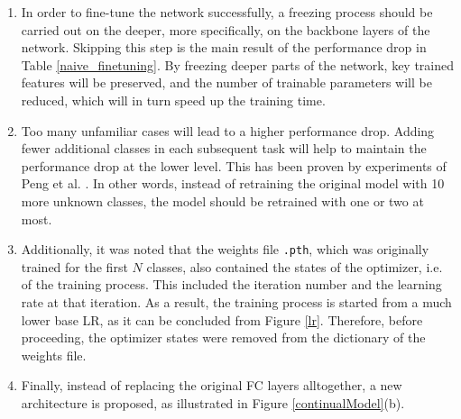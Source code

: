 \documentclass[english, 12pt, a4paper, elec, utf8, a-1b, online]{aaltothesis}
\begin{document}
\begin{enumerate}
\item In order to fine-tune the network successfully, a freezing process should be carried out on the deeper, more specifically, on the backbone layers of the network. Skipping this step is the main result of the performance drop in Table \ref{naive_finetuning}. By freezing deeper parts of the network, key trained features will be preserved, and the number of trainable parameters will be reduced, which will in turn speed up the training time. 
\item Too many unfamiliar cases will lead to a higher performance drop. Adding fewer additional classes in each subsequent task will help to maintain the performance drop at the lower level. This has been proven by experiments of Peng et al. \cite{Peng2020}. In other words, instead of retraining the original model with 10 more unknown classes, the model should be retrained with one or two at most. 
\item Additionally, it was noted that the weights file \texttt{.pth}, which was originally trained for the first $N$ classes, also contained the states of the optimizer, i.e. of the training process. This included the iteration number and the learning rate at that iteration. As a result, the training process is started from a much lower base LR, as it can be concluded from Figure \ref{lr}. Therefore, before proceeding, the optimizer states were removed from the dictionary of the weights file. 
\item Finally, instead of replacing the original FC layers alltogether, a new architecture is proposed, as illustrated in Figure \ref{continualModel}(b). 
\end{enumerate}
\end{document}
